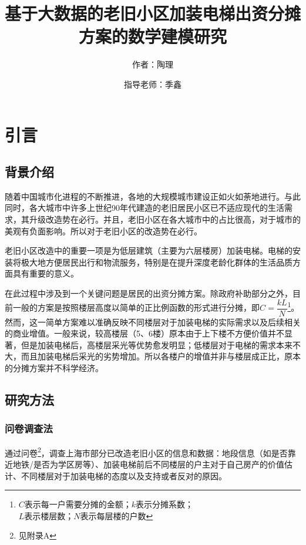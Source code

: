 \documentclass[lang=cn,a4paper]{elegantpaper}
\title{基于大数据的老旧小区加装电梯出资分摊方案的数学建模研究}
\author{作者：陶理 \and 指导老师：季鑫}
\institute{上海市实验学校}
\date{\zhtoday}
\begin{document}
    \maketitle
    
    \begin{abstract}
    \end{abstract}

    \section{引言}

    \subsection{背景介绍}

    随着中国城市化进程的不断推进，各地的大规模城市建设正如火如荼地进行。与此同时，各大城市中许多上世纪90年代建造的老旧居民小区已不适应现代的生活需求，其升级改造势在必行。并且，老旧小区在各大城市中的占比很高\cite{research.ke}，对于城市的美观有负面影响。所以对于老旧小区的改造势在必行。
    
    老旧小区改造中的重要一项是为低层建筑（主要为六层楼房）加装电梯。电梯的安装将极大地方便居民出行和物流服务，特别是在提升深度老龄化群体的生活品质方面具有重要的意义。
    
    在此过程中涉及到一个关键问题是居民的出资分摊方案。除政府补助部分之外，目前一般的方案是按照楼层高度以简单的正比例函数的形式进行分摊，即$C=\dfrac{kL}{N}$\footnote{$C$表示每一户需要分摊的金额；$k$表示分摊系数；\\$L$表示楼层数；$N$表示每层楼的户数}。然而，这一简单方案难以准确反映不同楼层对于加装电梯的实际需求以及后续相关的商业增值。一般来说，较高楼层（5、6楼）原本由于上下楼不方便价值并不显著，但是加装电梯后，高楼层采光等优势愈发明显；低楼层对于电梯的需求本来不大，而且加装电梯后采光的劣势增加。所以各楼户的增值并非与楼层成正比，原本的分摊方案并不科学经济。
    
    \subsection{研究方法}

    \subsubsection{问卷调查法}
    通过问卷\footnote{见附录A}，调查上海市部分已改造老旧小区的信息和数据：地段信息（如是否靠近地铁/是否为学区房等）、加装电梯前后不同楼层的户主对于自己房产的价值估计、不同楼层对于加装电梯的态度以及支持或者反对的原因。
\end{document}
